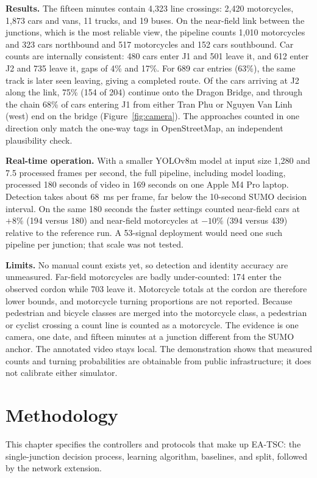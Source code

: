 \documentclass[12pt,a4paper]{report}
\newcommand{\methodname}{EA-TSC}
\begin{document}
\textbf{Results.} The fifteen minutes contain 4,323 line crossings: 2,420 motorcycles, 1,873 cars and vans, 11 trucks, and 19 buses. On the near-field link between the junctions, which is the most reliable view, the pipeline counts 1,010 motorcycles and 323 cars northbound and 517 motorcycles and 152 cars southbound. Car counts are internally consistent: 480 cars enter J1 and 501 leave it, and 612 enter J2 and 735 leave it, gaps of 4\% and 17\%. For 689 car entries (63\%), the same track is later seen leaving, giving a completed route. Of the cars arriving at J2 along the link, 75\% (154 of 204) continue onto the Dragon Bridge, and through the chain 68\% of cars entering J1 from either Tran Phu or Nguyen Van Linh (west) end on the bridge (Figure~\ref{fig:camera}). The approaches counted in one direction only match the one-way tags in OpenStreetMap, an independent plausibility check.

\textbf{Real-time operation.} With a smaller YOLOv8m model at input size 1,280 and 7.5 processed frames per second, the full pipeline, including model loading, processed 180 seconds of video in 169 seconds on one Apple M4 Pro laptop. Detection takes about 68~ms per frame, far below the 10-second SUMO decision interval. On the same 180 seconds the faster settings counted near-field cars at $+8\%$ (194 versus 180) and near-field motorcycles at $-10\%$ (394 versus 439) relative to the reference run. A 53-signal deployment would need one such pipeline per junction; that scale was not tested.

\textbf{Limits.} No manual count exists yet, so detection and identity accuracy are unmeasured. Far-field motorcycles are badly under-counted: 174 enter the observed cordon while 703 leave it. Motorcycle totals at the cordon are therefore lower bounds, and motorcycle turning proportions are not reported. Because pedestrian and bicycle classes are merged into the motorcycle class, a pedestrian or cyclist crossing a count line is counted as a motorcycle. The evidence is one camera, one date, and fifteen minutes at a junction different from the SUMO anchor. The annotated video stays local. The demonstration shows that measured counts and turning probabilities are obtainable from public infrastructure; it does not calibrate either simulator.

\chapter{Methodology}\label{ch:method}
This chapter specifies the controllers and protocols that make up \methodname{}: the single-junction decision process, learning algorithm, baselines, and split, followed by the network extension.
\end{document}
